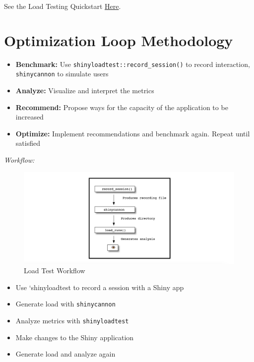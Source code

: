 \documentclass[]{book}
\providecommand{\tightlist}{%
  \setlength{\itemsep}{0pt}\setlength{\parskip}{0pt}}
\theoremstyle{definition}
\theoremstyle{definition}
\theoremstyle{definition}
\theoremstyle{remark}
\begin{document}
See the Load Testing Quickstart
\href{https://rstudio.github.io/shinyloadtest/\#quick-start}{Here}.

\hypertarget{optimization-loop-methodology}{%
\section{Optimization Loop
Methodology}\label{optimization-loop-methodology}}

\begin{itemize}
\tightlist
\item
  \textbf{Benchmark:} Use \texttt{shinyloadtest::record\_session()} to
  record interaction, \texttt{shinycannon} to simulate users
\item
  \textbf{Analyze:} Visualize and interpret the metrics
\item
  \textbf{Recommend:} Propose ways for the capacity of the application
  to be increased
\item
  \textbf{Optimize:} Implement recommendations and benchmark again.
  Repeat until satisfied
\end{itemize}

\emph{Workflow:}

\begin{figure}
\centering
\includegraphics{imgs/loadtesting/loadtest-workflow.png}
\caption{Load Test Workflow}
\end{figure}

\begin{itemize}
\tightlist
\item
  Use `shinyloadtest to record a session with a Shiny app
\item
  Generate load with \texttt{shinycannon}
\item
  Analyze metrics with \texttt{shinyloadtest}
\item
  Make changes to the Shiny application
\item
  Generate load and analyze again
\end{itemize}
\end{document}
